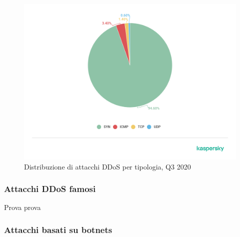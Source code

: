 \begin{figure}[h]
    \includegraphics[width=\hsize]{images/introduzione/07-en-ddos-report-q3-2020-chrarts.png}
    \caption{Distribuzione di attacchi DDoS per tipologia, Q3 2020 \cite{ddos_kaspersky_q3_2020}}
    \centering
\end{figure}

\subsubsection{Attacchi DDoS famosi}


Prova prova

\subsubsection{Attacchi basati su botnets}

